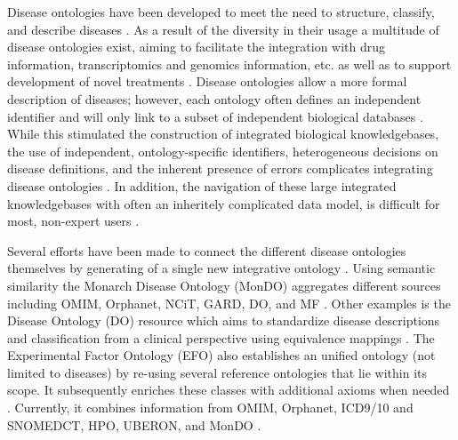 \documentclass[9pt,a4paper,]{extarticle}
\begin{document}
Disease ontologies have been developed to meet the need to structure, classify, and describe diseases \citep{Gruber1993, Haendel2018, Hoehndorf2013}. As a result of the diversity in their usage a multitude of disease ontologies exist, aiming to facilitate the integration with drug information, transcriptomics and genomics information, etc. as well as to support development of novel treatments \citep{Haendel2018, Hoehndorf2013, Rappaport2013}. Disease ontologies allow a more formal description of diseases; however, each ontology often defines an independent identifier and will only link to a subset of independent biological databases \citep{Hasnain2014, Hoehndorf2013, Kibbe2015, Livingston2015, Malone2010, Rappaport2013}. While this stimulated the construction of integrated biological knowledgebases, the use of independent, ontology-specific identifiers, heterogeneous decisions on disease definitions, and the inherent presence of errors complicates integrating disease ontologies \citep{Livingston2015, Rappaport2013}. In addition, the navigation of these large integrated knowledgebases with often an inheritely complicated data model, is difficult for most, non-expert users \citep{Hasnain2014, Hu2017, Livingston2015}.

Several efforts have been made to connect the different disease ontologies themselves by generating of a single new integrative ontology \citep{Mungall2017, Shefchek2019, Rappaport2013}. Using semantic similarity the Monarch Disease Ontology (MonDO) aggregates different sources including OMIM, Orphanet, NCiT, GARD, DO, and MF \citep{Mungall2017, Shefchek2019}. Other examples is the Disease Ontology (DO) resource which aims to standardize disease descriptions and classification from a clinical perspective using equivalence mappings \citep{Cheng2013, Schriml2015, Yu2015}. The Experimental Factor Ontology (EFO) also establishes an unified ontology (not limited to diseases) by re-using several reference ontologies that lie within its scope. It subsequently enriches these classes with additional axioms when needed \citep{Malone2010}. Currently, it combines information from OMIM, Orphanet, ICD9/10 and SNOMEDCT, HPO, UBERON, and MonDO \citep{EFO2019}.
\end{document}
